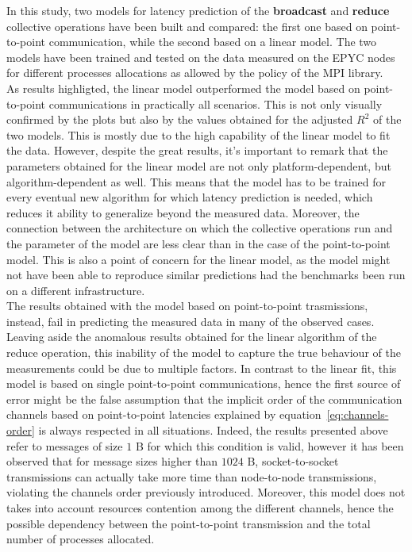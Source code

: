 \documentclass[../main.tex]{subfiles}
\begin{document}
In this study, two models for latency prediction of the \textbf{broadcast} and \textbf{reduce} collective operations have been built and compared: the first one based on point-to-point communication, while the second based on a linear model. The two models have been trained and tested on the data measured on the EPYC nodes for different processes allocations as allowed by the  policy of the MPI library.\\
As results highligted, the linear model outperformed the model based on point-to-point communications in practically all scenarios. This is not only visually confirmed by the plots but also by the values obtained for the adjusted $R^2$ of the two models. This is mostly due to the high capability of the linear model to fit the data. However, despite the great results, it's important to remark that the parameters obtained for the linear model are not only platform-dependent, but algorithm-dependent as well. This means that the model has to be trained for every eventual new algorithm for which latency prediction is needed, which reduces it ability to generalize beyond the measured data. Moreover, the connection between the architecture on which the collective operations run and the parameter of the model are less clear than in the case of the point-to-point model. This is also a point of concern for the linear model, as the model might not have been able to reproduce similar predictions had the benchmarks been run on a different infrastructure.\\
The results obtained with the model based on point-to-point trasmissions, instead, fail in predicting the measured data in many of the observed cases. 
Leaving aside the anomalous results obtained for the linear algorithm of the reduce operation, this inability of the model to capture the true behaviour of the measurements could be due to multiple factors. In contrast to the linear fit, this model is based on single point-to-point communications, hence the first source of error might be the false assumption that the implicit order of the communication channels based on point-to-point latencies explained by equation~\ref{eq:channels-order} is always respected in all situations. Indeed, the results presented above refer to messages of size $1$ B for which this condition is valid, however it has been observed that for message sizes higher than $1024$ B, socket-to-socket transmissions can actually take more time than node-to-node transmissions, violating the channels order previously introduced. Moreover, this model does not takes into account resources contention among the different channels, hence the possible dependency between the point-to-point transmission and the total number of processes allocated.
\end{document}
